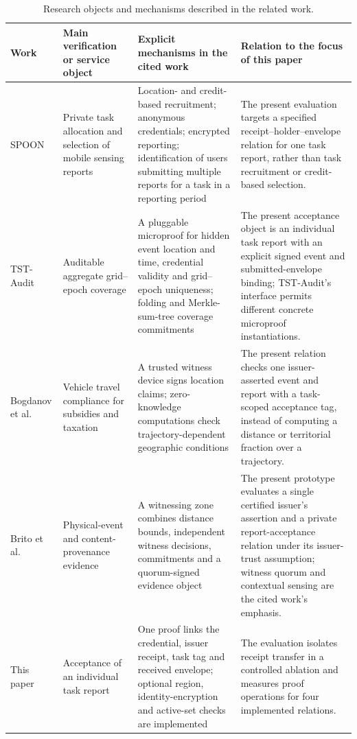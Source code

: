 \documentclass[pdflatex,iicol,sn-mathphys-num]{sn-jnl}
\begin{document}
\begin{table}[t]
\centering\small
\caption{Research objects and mechanisms described in the related work.}\label{tab:comparison-context}
\begin{tabularx}{\textwidth}{@{}p{}p{}p{}X@{}}
\toprule
Work & Main verification or service object & Explicit mechanisms in the cited work & Relation to the focus of this paper \\\midrule
SPOON~\citep{Ni2020SPOON} & Private task allocation and selection of mobile sensing reports & Location- and credit-based recruitment; anonymous credentials; encrypted reporting; identification of users submitting multiple reports for a task in a reporting period & The present evaluation targets a specified receipt--holder--envelope relation for one task report, rather than task recruitment or credit-based selection. \\
TST-Audit~\citep{He2026TSTAudit} & Auditable aggregate grid--epoch coverage & A pluggable microproof for hidden event location and time, credential validity and grid--epoch uniqueness; folding and Merkle-sum-tree coverage commitments & The present acceptance object is an individual task report with an explicit signed event and submitted-envelope binding; TST-Audit's interface permits different concrete microproof instantiations. \\
Bogdanov et al.~\citep{Bogdanov2025VehiclePolicy} & Vehicle travel compliance for subsidies and taxation & A trusted witness device signs location claims; zero-knowledge computations check trajectory-dependent geographic conditions & The present relation checks one issuer-asserted event and report with a task-scoped acceptance tag, instead of computing a distance or territorial fraction over a trajectory. \\
Brito et al.~\citep{Brito2026ContentProvenance} & Physical-event and content-provenance evidence & A witnessing zone combines distance bounds, independent witness decisions, commitments and a quorum-signed evidence object & The present prototype evaluates a single certified issuer's assertion and a private report-acceptance relation under its issuer-trust assumption; witness quorum and contextual sensing are the cited work's emphasis. \\
This paper & Acceptance of an individual task report & One proof links the credential, issuer receipt, task tag and received envelope; optional region, identity-encryption and active-set checks are implemented & The evaluation isolates receipt transfer in a controlled ablation and measures proof operations for four implemented relations. \\
\bottomrule
\end{tabularx}
\end{table}
\end{document}
